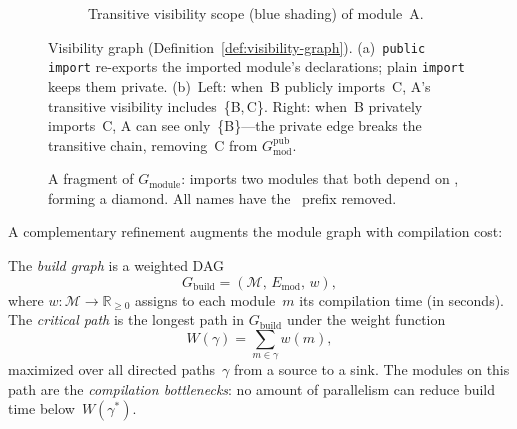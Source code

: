 \begin{figure}[!htb]
\begin{subfigure}[t]{0.48\textwidth}
\caption{Transitive visibility scope (blue shading) of module~A.}
\label{fig:vis-graph}
\end{subfigure}
\caption{Visibility graph (Definition~\ref{def:visibility-graph}). (a)~\texttt{public import} re-exports the imported module's declarations; plain \texttt{import} keeps them private. (b)~Left: when~B publicly imports~C, A's transitive visibility includes~\{B,\,C\}. Right: when~B privately imports~C, A can see only~\{B\}---the private edge breaks the transitive chain, removing~C from $G_{\mathrm{mod}}^{\mathrm{pub}}$.}
\label{fig:visibility}
\end{figure}

\begin{figure}[H]
\centering
{}
\caption{A fragment of $G_{\mathrm{module}}$:  imports two modules that both depend on , forming a diamond. All names have the \ prefix removed.}
\label{fig:import-subgraph}
\end{figure}

A complementary refinement augments the module graph with compilation cost:

\begin{definition}\label{def:build-graph}
The \emph{build graph} is a weighted DAG
\[
  G_{\mathrm{build}} = (\mathcal{M},\, E_{\mathrm{mod}},\, w),
\]
where $w : \mathcal{M} \to \mathbb{R}_{\ge 0}$ assigns to each module~$m$ its compilation time (in seconds). The \emph{critical path} is the longest path in $G_{\mathrm{build}}$ under the weight function
\[
  W(\gamma) = \sum_{m \in \gamma} w(m),
\]
maximized over all directed paths~$\gamma$ from a source to a sink. The modules on this path are the \emph{compilation bottlenecks}: no amount of parallelism can reduce build time below~$W(\gamma^*)$.
\end{definition}

